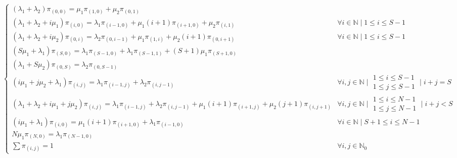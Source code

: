 \documentclass[10pt,a4paper]{article}
\begin{document}
\begin{adjustbox}{center=\textwidth}
\label{equation:AccessControlAlgorithm1-BalanceEquations}

$\begin{cases} 
(\lambda_1 + \lambda_2)\pi_{(0,0)} = \mu_1\pi_{(1,0)} + \mu_2\pi_{(0,1)} \\

(\lambda_1 + \lambda_2 + i\mu_1)\pi_{(i,0)} = \lambda_1\pi_{(i-1,0)} + \mu_1(i+1)\pi_{(i+1,0)} + \mu_2\pi_{(i,1)} & \forall i \in \mathbb{N} \mid 1 \leq i \leq S-1 \\

(\lambda_1 + \lambda_2 + i\mu_2)\pi_{(0,i)} = \lambda_2\pi_{(0,i-1)} + \mu_1\pi_{(1,i)} + \mu_2(i+1)\pi_{(0,i+1)} & \forall i \in \mathbb{N} \mid 1 \leq i \leq S-1 \\

(S\mu_1+\lambda_1)\pi_{(S,0)} = \lambda_1\pi_{(S-1,0)} + \lambda_1\pi_{(S-1,1)} + (S+1)\mu_1 \pi_{(S+1,0)}\\

(\lambda_1 + S\mu_2) \pi_{(0,S)} = \lambda_2\pi_{(0,S-1)} \\

(i\mu_1 + j\mu_2 + \lambda_1)\pi_{(i,j)} = \lambda_1\pi_{(i-1,j)} + \lambda_2\pi_{(i,j-1)} & \forall i,j \in \mathbb{N} \mid \begin{array} {l} 1 \leq i \leq S-1 \\ 1 \leq j \leq S-1 \end{array} \mid i + j = S \\

(\lambda_1 + \lambda_2 + i\mu_1 + j\mu_2)\pi_{(i,j)} = \lambda_1\pi_{(i-1,j)} + \lambda_2\pi_{(i,j-1)} + \mu_1(i+1)\pi_{(i+1,j)} + \mu_2(j+1)\pi_{(i,j+1)} & \forall i,j \in \mathbb{N} \mid \begin{array} {l} 1 \leq i \leq N-1 \\ 1 \leq j \leq N-1 \end{array} \mid i + j < S \\

(i\mu_1 + \lambda_1)\pi_{(i,0)} = \mu_1(i+1)\pi_{(i+1,0)} + \lambda_1\pi_{(i-1,0)} & \forall i \in \mathbb{N} \mid S+1 \leq i \leq N-1 \\

N\mu_1\pi_{(N,0)} = \lambda_1\pi_{(N-1,0)} \\

\sum \pi_{(i,j)} = 1 & \forall i,j \in \mathbb{N}_0

\end{cases}
$ 
\end{adjustbox}
\end{document}
